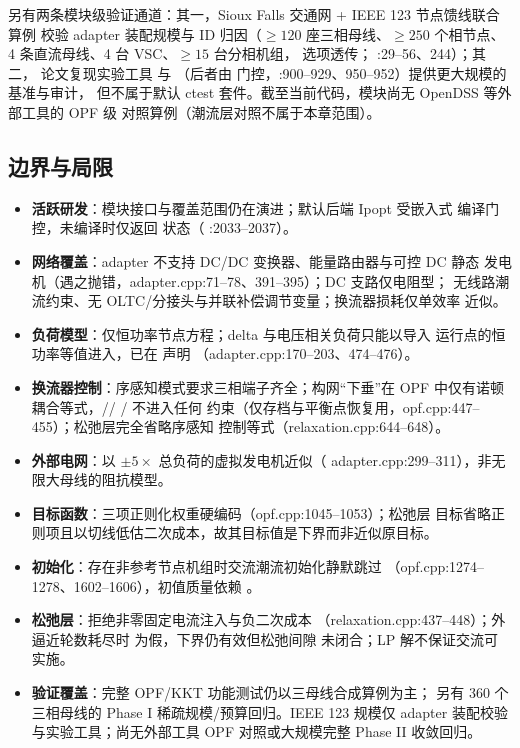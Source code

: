 另有两条模块级验证通道：其一，Sioux Falls 交通网 + IEEE 123 节点馈线联合算例
校验 adapter 装配规模与 ID 归因（$\ge 120$ 座三相母线、$\ge 250$ 个相节点、
4 条直流母线、4 台 VSC、$\ge 15$ 台分相机组， 选项透传；
:29--56、244）；其二，
论文复现实验工具  与
（后者由 
门控，:900--929、950--952）提供更大规模的基准与审计，
但不属于默认 ctest 套件。截至当前代码，模块尚无 OpenDSS 等外部工具的 OPF 级
对照算例（潮流层对照不属于本章范围）。

\subsection{边界与局限}\label{subsec:tp-limit}

\begin{itemize}
  \item \textbf{活跃研发}：模块接口与覆盖范围仍在演进；默认后端 Ipopt 受嵌入式
        编译门控，未编译时仅返回  状态（
        :2033--2037）。
  \item \textbf{网络覆盖}：adapter 不支持 DC/DC 变换器、能量路由器与可控 DC 静态
        发电机（遇之抛错，adapter.cpp:71--78、391--395）；DC 支路仅电阻型；
        无线路潮流约束、无 OLTC/分接头与并联补偿调节变量；换流器损耗仅单效率
        近似。
  \item \textbf{负荷模型}：仅恒功率节点方程；delta 与电压相关负荷只能以导入
        运行点的恒功率等值进入，已在  声明
        （adapter.cpp:170--203、474--476）。
  \item \textbf{换流器控制}：序感知模式要求三相端子齐全；构网“下垂”在 OPF
        中仅有诺顿耦合等式，//%
        / 不进入任何
        约束（仅存档与平衡点恢复用，opf.cpp:447--455）；松弛层完全省略序感知
        控制等式（relaxation.cpp:644--648）。
  \item \textbf{外部电网}：以 $\pm5\times$ 总负荷的虚拟发电机近似（
        adapter.cpp:299--311），非无限大母线的阻抗模型。
  \item \textbf{目标函数}：三项正则化权重硬编码（opf.cpp:1045--1053）；松弛层
        目标省略正则项且以切线低估二次成本，故其目标值是下界而非近似原目标。
  \item \textbf{初始化}：存在非参考节点机组时交流潮流初始化静默跳过
        （opf.cpp:1274--1278、1602--1606），初值质量依赖 。
  \item \textbf{松弛层}：拒绝非零固定电流注入与负二次成本
        （relaxation.cpp:437--448）；外逼近轮数耗尽时
         为假，下界仍有效但松弛间隙
        未闭合；LP 解不保证交流可实施。
  \item \textbf{验证覆盖}：完整 OPF/KKT 功能测试仍以三母线合成算例为主；
        另有 360 个三相母线的 Phase I 稀疏规模/预算回归。IEEE 123 规模仅
        adapter 装配校验与实验工具；尚无外部工具 OPF 对照或大规模完整
        Phase II 收敛回归。
\end{itemize}
